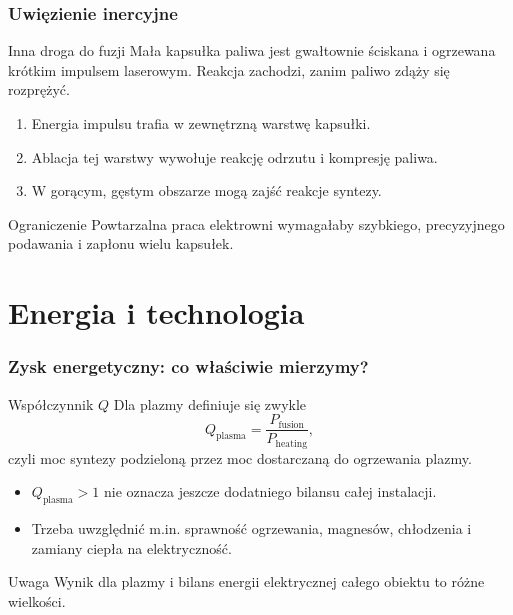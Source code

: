 \documentclass[aspectratio=169,11pt]{beamer}
\begin{document}
\begin{frame}
  \frametitle{Uwięzienie inercyjne}
  \begin{exampleblock}{Inna droga do fuzji}
    Mała kapsułka paliwa jest gwałtownie ściskana i ogrzewana krótkim
    impulsem laserowym. Reakcja zachodzi, zanim paliwo zdąży się rozprężyć.
  \end{exampleblock}
  \begin{enumerate}
    \item Energia impulsu trafia w zewnętrzną warstwę kapsułki.
    \item Ablacja tej warstwy wywołuje reakcję odrzutu i kompresję paliwa.
    \item W gorącym, gęstym obszarze mogą zajść reakcje syntezy.
  \end{enumerate}
  \begin{alertblock}{Ograniczenie}
    Powtarzalna praca elektrowni wymagałaby szybkiego, precyzyjnego
    podawania i zapłonu wielu kapsułek.
  \end{alertblock}
\end{frame}

\section{Energia i technologia}
\begin{frame}
  \frametitle{Zysk energetyczny: co właściwie mierzymy?}
  \begin{block}{Współczynnik \(Q\)}
    Dla plazmy definiuje się zwykle
    \[
      Q_{\mathrm{plasma}}=
      \frac{P_{\mathrm{fusion}}}{P_{\mathrm{heating}}},
    \]
    czyli moc syntezy podzieloną przez moc dostarczaną do ogrzewania plazmy.
  \end{block}
  \begin{itemize}
    \item \(Q_{\mathrm{plasma}}>1\) nie oznacza jeszcze dodatniego bilansu
      całej instalacji.
    \item Trzeba uwzględnić m.in. sprawność ogrzewania, magnesów,
      chłodzenia i zamiany ciepła na elektryczność.
  \end{itemize}
  \begin{alertblock}{Uwaga}
    Wynik dla plazmy i bilans energii elektrycznej całego obiektu to różne
    wielkości.
  \end{alertblock}
\end{frame}
\end{document}
